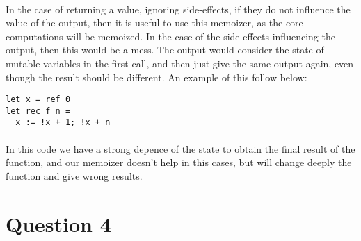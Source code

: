 \documentclass[letterpaper,10pt]{article}
\begin{document}
\paragraph{} In the case of returning a value, ignoring side-effects, if they do not influence the value of the output, then it is useful to use this memoizer, as the core computations will be memoized. In the case of the side-effects influencing the output, then this would be a mess. The output would consider the state of mutable variables in the first call, and then just give the same output again, even though the result should be different. An example of this follow below:
\begin{verbatim}
let x = ref 0
let rec f n = 
  x := !x + 1; !x + n
\end{verbatim}
\paragraph{} In this code we have a strong depence of the state to obtain the final result of the function, and our memoizer doesn't help in this cases, but will change deeply the function and give wrong results.
\section*{Question 4}
\end{document}
